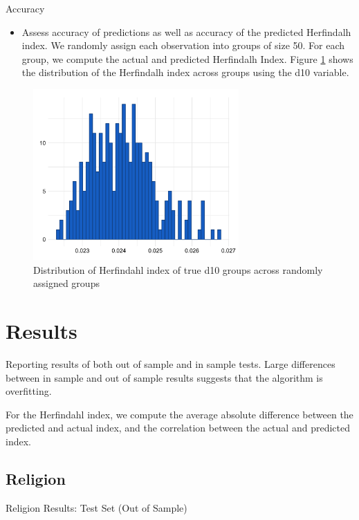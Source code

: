 \documentclass[11pt, oneside]{article}
\begin{document}
\noindent Accuracy
\begin{itemize}
\item Assess accuracy of predictions as well as accuracy of the predicted Herfindalh index. We randomly assign each observation into groups of size 50. For each group, we compute the actual and predicted Herfindalh Index. Figure \ref{herf_index_dist} shows the distribution of the Herfindalh index across groups using the d10 variable.
\end{itemize}

\begin{figure}[H]
  \caption{Distribution of Herfindahl index of true d10 groups across randomly assigned groups}
  \label{herf_index_dist}
  \centering
    \includegraphics[width=0.7\textwidth]{Figures/herfindalh_truth_index.png}
\end{figure}

\newpage
\section{Results}

Reporting results of both out of sample and in sample tests. Large differences between in sample and out of sample results suggests that the algorithm is overfitting.
\par
For the Herfindahl index, we compute the average absolute difference between the predicted and actual index, and the correlation between the actual and predicted index.

\subsection{Religion}

\setlength{\tabcolsep}{10pt}
\begin{table}[H]
\caption{Religion Results: Test Set (Out of Sample)}
\centering

\end{table}
\end{document}
